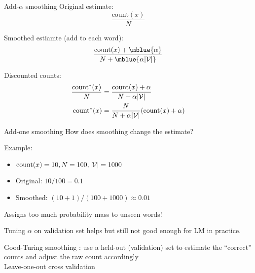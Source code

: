 \documentclass[usenames,dvipsnames,notes,11pt,aspectratio=169]{beamer}
\begin{document}
\begin{frame}
    {Add-$\alpha$ smoothing}
    Original estimate: \\
    $$
    \frac{\text{count}(x)}{N}
    $$
    \pause

    Smoothed estiamte (add  to each word):\\ 
    $$
    \frac{\text{count}(x) + \mblue{\alpha}}{N + \mblue{\alpha |\sV|}}
    $$
    \pause

    Discounted counts:\\
    \begin{align}
        \frac{\text{count}^*(x)}{N} &= 
\frac{\text{count}(x) + {\alpha}}{N + {\alpha |\mathcal{V}|}}\\
        \text{count}^*(x) &= \frac{N}{N + {\alpha |\mathcal{V}|}} (\text{count}(x) + \alpha)
    \end{align}
\end{frame}

\begin{frame}
    {Add-one smoothing}
    How does smoothing change the estimate?

    Example:\\
    \begin{itemize}
        \item[] $\text{count}(x)=10, N=100, |\mathcal{V}|=1000$
        \item[] Original: $10/100=0.1$
        \item[] Smoothed: $(10+1)/(100+1000)\approx 0.01$
    \end{itemize}

    \pause
    Assigns too much probability mass to unseen words!

    Tuning $\alpha$ on validation set helps but still not good enough for LM in practice.
\end{frame}

\begin{frame}
    {Good-Turing smoothing}
    : use a held-out (validation) set to estimate the ``correct'' counts and adjust the raw count accordingly\\

    Leave-one-out cross validation\\

    \gray{[board]}

\end{frame}
\end{document}
